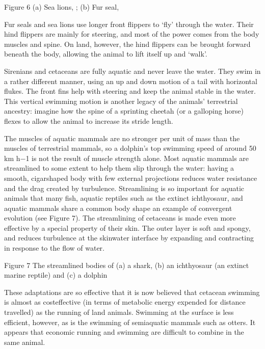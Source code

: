 \documentclass[letterpaper,10pt,english]{sphinxmanual}
\let\sphinxpxdimen\pdfpxdimen\else\newdimen\sphinxpxdimen
\begin{document}
\sphinxincludegraphics[width=512\sphinxpxdimen,height=192\sphinxpxdimen]{{s182_11_figure_6_composite}.jpg}

Figure 6 (a) Sea lions, ; (b) Fur seal, 

Fur seals and sea lions use longer front flippers to ‘fly’ through the water. Their hind flippers are mainly for steering, and most of the power comes from the body muscles and spine. On land, however, the hind flippers can be brought forward beneath the body, allowing the animal to lift itself up and ‘walk’.

Sirenians and cetaceans are fully aquatic and never leave the water. They swim in a rather different manner, using an up and down motion of a tail with horizontal flukes. The front fins help with steering and keep the animal stable in the water. This vertical swimming motion is another legacy of the animals’ terrestrial ancestry: imagine how the spine of a sprinting cheetah (or a galloping horse) flexes to allow the animal to increase its stride length.

The muscles of aquatic mammals are no stronger per unit of mass than the muscles of terrestrial mammals, so a dolphin’s top swimming speed of around 50 km h−1 is not the result of muscle strength alone. Most aquatic mammals are streamlined to some extent to help them slip through the water: having a smooth, cigar\sphinxhyphen{}shaped body with few external projections reduces water resistance and the drag created by turbulence. Streamlining is so important for aquatic animals that many fish, aquatic reptiles
such as the extinct ichthyosaur, and aquatic mammals share a common body shape \textendash{} an example of convergent evolution (see Figure 7). The streamlining of cetaceans is made even more effective by a special property of their skin. The outer layer is soft and spongy, and reduces turbulence at the skin\textendash{}water interface by expanding and contracting in response to the flow of water.

\sphinxincludegraphics[width=511\sphinxpxdimen,height=506\sphinxpxdimen]{{s182_11_figure_7}.jpg}

Figure 7 The streamlined bodies of (a) a shark, (b) an ichthyosaur (an extinct marine reptile) and (c) a dolphin

These adaptations are so effective that it is now believed that cetacean swimming is almost as cost\sphinxhyphen{}effective (in terms of metabolic energy expended for distance travelled) as the running of land animals. Swimming at the surface is less efficient, however, as is the swimming of semi\sphinxhyphen{}aquatic mammals such as otters. It appears that economic running and swimming are difficult to combine in the same animal.
\end{document}
